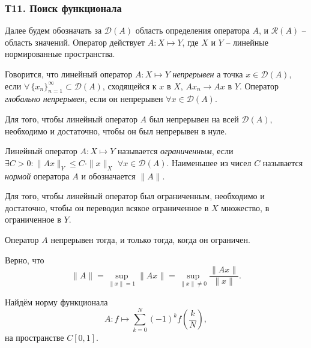 
\subsubsection*{Т11. Поиск функционала}

Далее будем обозначать за $\mathcal D(A)$ область определения оператора $A$, и $\mathcal R (A)$ -- область значений. Оператор действует $A \colon  X \mapsto Y$, где $X$ и $Y$ -- линейные нормированные пространства. 

\begin{to_def}
    Говорится, что линейный оператор $A \colon  X \mapsto Y$ \textit{непрерывен} а точка $x \in \mathcal D(A)$, если $\forall \, \{x_n\}_{n=1}^{\infty} \subset \mathcal D(A)$, сходящейся к $x$ в $X$, $A x_n \to A x$ в $Y$. Оператор \textit{глобально непрерывен}, если он непрерывен $\forall x \in \mathcal D(A)$. 
\end{to_def}

\begin{to_lem}
    Для того, чтобы линейный оператор $A$ был непрерывен на всей $\mathcal D(A)$, необходимо и достаточно, чтобы он был непрерывен в нуле.
\end{to_lem}

\begin{to_def}
    Линейный оператор $A \colon  X \mapsto Y$ называется \textit{ограниченным}, если $\exists C >0 \colon  \|A x\|_Y \leq C \cdot \|x\|_X$ $\forall x \in \mathcal D(A)$. Наименьшее из чисел $C$ называется \textit{нормой} оператора $A$ и обозначается $\|A\|$. 
\end{to_def}

\begin{to_lem}
    Для того, чтобы линейный оператор был ограниченным, необходимо и достаточно, чтобы он переводил всякое ограниченное в $X$ множество, в ограниченное в $Y$. 
\end{to_lem}

\begin{to_thr}[]
    Оператор $A$ непрерывен тогда, и только тогда, когда он ограничен.
\end{to_thr}

\begin{to_thr}
    Верно, что 
    \begin{equation*}
        \|A\| = \sup_{\|x\|=1} \|Ax\| = \sup_{\|x\|\neq 0} \frac{\|Ax\|}{\|x\|}.
    \end{equation*}
\end{to_thr}


Найдём норму функционала
\begin{equation*}
    A \colon  f \mapsto \sum_{k=0}^N (-1)^k f\left(\frac{k}{N}\right),
\end{equation*}
на пространстве $C[0,1]$. 


